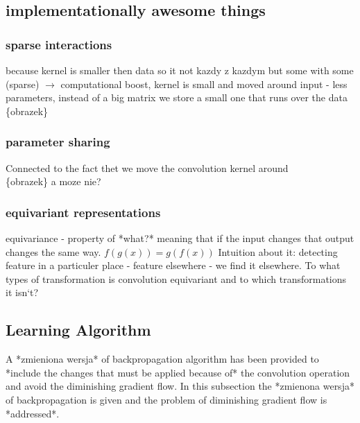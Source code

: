 \documentclass[a4paper,10pt]{report}
\begin{document}
      \subsection{implementationally awesome things} %
	
	\subsubsection{sparse interactions} %
	  because kernel is smaller then data so it not kazdy z kazdym but some with some (sparse) $\rightarrow$ computational boost, kernel is small and moved around input - less parameters, instead of a big matrix we store a small one that runs over the data\\
	  
	  \{obrazek\} %
	  
	\subsubsection{parameter sharing} %
	  Connected to the fact thet we move the convolution kernel around \\
	  
	  \{obrazek\} a moze nie?
	  
	\subsubsection{equivariant representations} %
	  equivariance - property of *what?* meaning that if the input changes that output changes the same way. $f(g(x)) = g(f(x))$ Intuition about it: detecting feature in a particuler place - feature elsewhere - we find it elsewhere. To what types of transformation is convolution equivariant and to which transformations it isn`t?
      
      \subsection{Learning Algorithm} %
	A *zmieniona wersja* of backpropagation algorithm has been provided to *include the changes that must be applied because of* the convolution operation and avoid the diminishing gradient flow. In this subsection the *zmienona wersja* of backpropagation is given and the problem of diminishing gradient flow is *addressed*.
	
\end{document}
